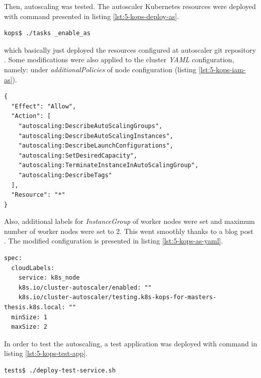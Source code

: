 Then, autoscaling was tested. The autoscaler Kubernetes resources were deployed with command presented in listing \ref{lst:5-kops-deploy-as}.
\begin{lstlisting}[basicstyle=\scriptsize,xleftmargin=0cm,label=lst:5-kops-deploy-as,caption={\textit{Bash} command to deploy autoscaker}]
kops$ ./tasks _enable_as
\end{lstlisting}
which basically just deployed the resources configured at autoscaler git repository \cite{as-github}. Some modifications were also applied to the cluster \textit{YAML} configuration, namely: under \textit{additionalPolicies} of node configuration (listing \ref{lst:5-kops-iam-as}).
\begin{lstlisting}[basicstyle=\scriptsize,xleftmargin=0cm,label=lst:5-kops-iam-as,caption={IAM Policies needed by autoscaler}]
{
  "Effect": "Allow",
  "Action": [
    "autoscaling:DescribeAutoScalingGroups",
    "autoscaling:DescribeAutoScalingInstances",
    "autoscaling:DescribeLaunchConfigurations",
    "autoscaling:SetDesiredCapacity",
    "autoscaling:TerminateInstanceInAutoScalingGroup",
    "autoscaling:DescribeTags"
  ],
  "Resource": "*"
}
\end{lstlisting}
Also, additional labels for \textit{InstanceGroup} of worker nodes were set and maximum number of worker nodes were set to 2. This went smoothly thanks to a blog post \cite{as-blog}. The modified configuration is presented in listing \ref{lst:5-kops-as-yaml}.
\begin{lstlisting}[basicstyle=\scriptsize,xleftmargin=0cm,label=lst:5-kops-as-yaml,caption={\textit{Kops} cluster \textit{YAML} configuration needed for autoscaler}]
spec:
  cloudLabels:
    service: k8s_node
    k8s.io/cluster-autoscaler/enabled: ""
    k8s.io/cluster-autoscaler/testing.k8s-kops-for-masters-thesis.k8s.local: ""
  minSize: 1
  maxSize: 2
\end{lstlisting}

In order to test the autoscaling, a test application was deployed with command in listing \ref{lst:5-kops-test-app}.
\begin{lstlisting}[basicstyle=\scriptsize,xleftmargin=0cm,label=lst:5-kops-test-app,caption={Deploying a test application},captionpos=b,language=Bash]
tests$ ./deploy-test-service.sh
\end{lstlisting}

